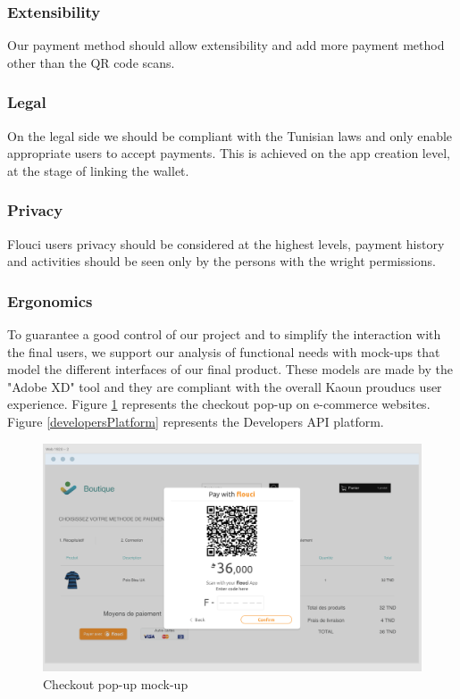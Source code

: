 \begin{spacing}{1.2}
\subsubsection{Extensibility}
Our payment method should allow extensibility and add more payment method other than the QR code scans. 
\subsubsection{Legal}
On the legal side we should be compliant with the Tunisian laws and only enable appropriate users to accept payments.
This is achieved on the app creation level, at the stage of linking the wallet.
\subsubsection{Privacy}
Flouci users privacy should be considered at the highest levels, payment history and activities should be seen only by the persons with the wright permissions.
\subsubsection{Ergonomics}
To guarantee a good control of our project and to simplify the interaction with the final users, we support our analysis of functional needs with mock-ups that model the different interfaces of our final product. These models are made by the "Adobe XD" tool and they are compliant with the overall Kaoun prouducs user experience. \newline Figure \ref{checkoutScreen} represents the checkout pop-up on e-commerce websites.
\newline Figure \ref{developersPlatform} represents the Developers API platform.

\begin{figure}[H]\centering
\includegraphics[scale=0.4]{Checkout_screen}
\caption{Checkout pop-up mock-up}
\label{checkoutScreen}
\end{figure}


\end{spacing}
